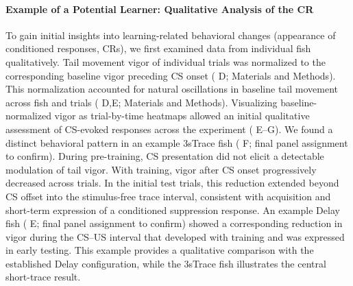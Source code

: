 \paragraph{Example of a Potential Learner: Qualitative Analysis of the CR}
To gain initial insights into learning-related behavioral changes (appearance of conditioned responses, CRs), we first examined data from individual fish qualitatively.
Tail movement vigor of individual trials was normalized to the corresponding baseline vigor preceding CS onset ( D; Materials and Methods). This normalization accounted for natural oscillations in baseline tail movement across fish and trials ( D,E; Materials and Methods).
Visualizing baseline-normalized vigor as trial-by-time heatmaps allowed an initial qualitative assessment of CS-evoked responses across the experiment ( E--G).
We found a distinct behavioral pattern in an example 3sTrace fish ( F; final panel assignment to confirm). During pre-training, CS presentation did not elicit a detectable modulation of tail vigor. With training, vigor after CS onset progressively decreased across trials. In the initial test trials, this reduction extended beyond CS offset into the stimulus-free trace interval, consistent with acquisition and short-term expression of a conditioned suppression response.
An example Delay fish ( E; final panel assignment to confirm) showed a corresponding reduction in vigor during the CS--US interval that developed with training and was expressed in early testing. This example provides a qualitative comparison with the established Delay configuration, while the 3sTrace fish illustrates the central short-trace result.
